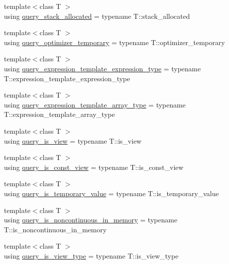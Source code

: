 \begin{DoxyCompactItemize}
\item 
{\footnotesize template$<$class T $>$ }\\using \hyperlink{namespacebc_1_1tensors_1_1exprs_1_1detail_a35543bad82197de0bb8d50c079e7cbaf}{query\+\_\+stack\+\_\+allocated} = typename T\+::stack\+\_\+allocated
\item 
{\footnotesize template$<$class T $>$ }\\using \hyperlink{namespacebc_1_1tensors_1_1exprs_1_1detail_acc14ea393b9060eea11b720233170f80}{query\+\_\+optimizer\+\_\+temporary} = typename T\+::optimizer\+\_\+temporary
\item 
{\footnotesize template$<$class T $>$ }\\using \hyperlink{namespacebc_1_1tensors_1_1exprs_1_1detail_a8daec353fcf1440e3e610f412a2228d8}{query\+\_\+expression\+\_\+template\+\_\+expression\+\_\+type} = typename T\+::expression\+\_\+template\+\_\+expression\+\_\+type
\item 
{\footnotesize template$<$class T $>$ }\\using \hyperlink{namespacebc_1_1tensors_1_1exprs_1_1detail_a4f6ef9491d82383737761491907159ae}{query\+\_\+expression\+\_\+template\+\_\+array\+\_\+type} = typename T\+::expression\+\_\+template\+\_\+array\+\_\+type
\item 
{\footnotesize template$<$class T $>$ }\\using \hyperlink{namespacebc_1_1tensors_1_1exprs_1_1detail_a6ed62ca06012f06dc8f6143998de1e9f}{query\+\_\+is\+\_\+view} = typename T\+::is\+\_\+view
\item 
{\footnotesize template$<$class T $>$ }\\using \hyperlink{namespacebc_1_1tensors_1_1exprs_1_1detail_a701fb55d84ce81a94fc5552092b64138}{query\+\_\+is\+\_\+const\+\_\+view} = typename T\+::is\+\_\+const\+\_\+view
\item 
{\footnotesize template$<$class T $>$ }\\using \hyperlink{namespacebc_1_1tensors_1_1exprs_1_1detail_a78329f6a449e413ac38baeaf0574e64d}{query\+\_\+is\+\_\+temporary\+\_\+value} = typename T\+::is\+\_\+temporary\+\_\+value
\item 
{\footnotesize template$<$class T $>$ }\\using \hyperlink{namespacebc_1_1tensors_1_1exprs_1_1detail_aa6d73fadec8691f52ebcd7254c6ec9bb}{query\+\_\+is\+\_\+noncontinuous\+\_\+in\+\_\+memory} = typename T\+::is\+\_\+noncontinuous\+\_\+in\+\_\+memory
\item 
{\footnotesize template$<$class T $>$ }\\using \hyperlink{namespacebc_1_1tensors_1_1exprs_1_1detail_af39d29f1c790dbc0fdcb388eb3764ce8}{query\+\_\+is\+\_\+view\+\_\+type} = typename T\+::is\+\_\+view\+\_\+type
\end{DoxyCompactItemize}
